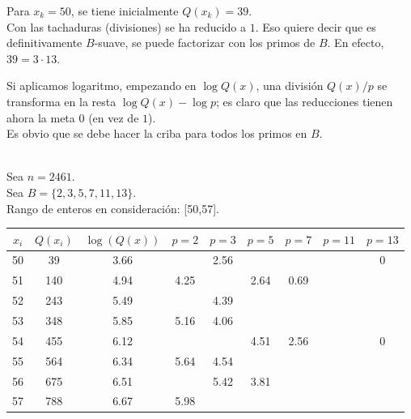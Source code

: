 \begin{ejemplo}
Para $x_k=50$, se tiene inicialmente $Q(x_k)=39$. \\
Con las tachaduras (divisiones) se ha reducido a $1$. Eso quiere decir que es definitivamente $B$-suave, se puede factorizar con los primos de $B$. En efecto, $39=3 \cdot 13$.
\end{ejemplo} 

Si aplicamos logaritmo, empezando en $\log Q(x)$, una división $Q(x) / p$ se transforma en la resta $\log {Q(x)} - \log p$; es claro que las reducciones tienen ahora la meta $0$ (en vez de $1$). \\

Es obvio que se debe hacer la criba para todos los primos en $B$.

\begin{ejemplo} \, \\
Sea $n = 2461$. \\
Sea $B = \{2, 3, 5, 7, 11,13\}$. \\
Rango de enteros en consideración: [50,57]. \\
\begin{tabular}{|c|c|c|c|c|c|c|c|c|}
\hline
$x_i$ & $Q(x_i)$ & $\log(Q(x))$ & $p=2$ & $p=3$ & $p=5$ & $p=7$ & $p=11$ & $p=13$ \\
\hline
50 & 39   & 3.66 &      & 2.56  &       &       &       & 0  \\
51 & 140  & 4.94 & 4.25 &       & 2.64  & 0.69  &       &   \\
52 & 243  & 5.49 &      & 4.39  &       &       &       &   \\
53 & 348  & 5.85 & 5.16 & 4.06  &       &       &       &   \\
54 & 455  & 6.12 &      &       & 4.51  & 2.56  &       & 0 \\
55 & 564  & 6.34 & 5.64 & 4.54  &       &       &       &   \\
56 & 675  & 6.51 &      & 5.42  & 3.81  &       &       &   \\
57 & 788  & 6.67 & 5.98 &       &       &       &       &   \\
\hline
\end{tabular}


\end{ejemplo}
